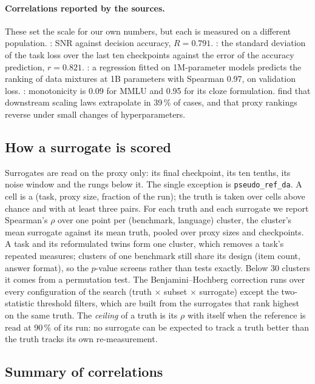 \paragraph{Correlations reported by the sources.}
These set the scale for our own numbers, but each is measured on a different population.
\citet{heineman_signal_2025}: SNR against decision accuracy, $R = 0.791$.
\citet{bhagia_establishing_2025}: the standard deviation of the task loss over the last ten checkpoints against the error of the accuracy prediction, $r = 0.821$.
\citet{liu_regmix_2025}: a regression fitted on 1M-parameter models predicts the ranking of data mixtures at 1B parameters with Spearman 0.97, on validation loss.
\citet{madaan_quantifying_2024}: monotonicity is 0.09 for MMLU and 0.95 for its cloze formulation.
\citet{lourie_scaling_2025} find that downstream scaling laws extrapolate in 39\,\% of cases, and \citet{wang_can_2026} that proxy rankings reverse under small changes of hyperparameters.

\subsection{How a surrogate is scored}
\label{app:sur-scoring}

Surrogates are read on the proxy only: its final checkpoint, its ten tenths, its noise window and the rungs below it.
The single exception is \texttt{pseudo\_ref\_da}.
A cell is a (task, proxy size, fraction of the run); the truth is taken over cells above chance and with at least three pairs.
For each truth and each surrogate we report Spearman's $\rho$ over one point per (benchmark, language) cluster, the cluster's mean surrogate against its mean truth, pooled over proxy sizes and checkpoints.
A task and its reformulated twins form one cluster, which removes a task's repeated measures; clusters of one benchmark still share its design (item count, answer format), so the $p$-value screens rather than tests exactly. Below 30 clusters it comes from a permutation test.
The Benjamini--Hochberg correction runs over every configuration of the search (truth $\times$ subset $\times$ surrogate) except the two-statistic threshold filters, which are built from the surrogates that rank highest on the same truth.
The \emph{ceiling} of a truth is its $\rho$ with itself when the reference is read at 90\,\% of its run: no surrogate can be expected to track a truth better than the truth tracks its own re-measurement.

\subsection{Summary of correlations}
\label{app:sur-results}

